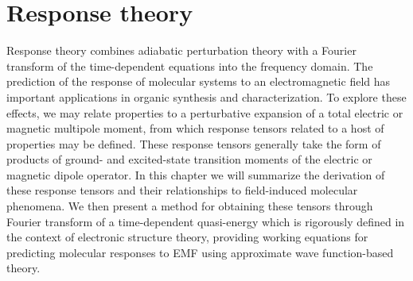 \section{Response theory} \label{se:res}
Response theory combines adiabatic perturbation theory with a Fourier transform of the 
time-dependent equations into the frequency domain.\cite{Barron2004,Pedersen2021} 
The prediction of the response of molecular systems to an electromagnetic field has 
important applications in organic synthesis and characterization. To explore these 
effects, we may relate properties to a perturbative expansion of a total electric or 
magnetic multipole moment, from which response tensors related to a host of properties 
may be defined. 
These response tensors generally take the form of products of ground- and excited-state 
transition moments of the electric or magnetic dipole operator. In this chapter we will 
summarize the derivation of these response tensors and their relationships to field-induced 
molecular phenomena. We then present a method for obtaining these tensors through Fourier 
transform of a time-dependent quasi-energy
\cite{Christiansen1998,Norman2011,Helgaker2012}
which is rigorously defined in the context of 
electronic structure theory, providing working equations for predicting molecular responses 
to EMF using approximate wave function-based theory.

